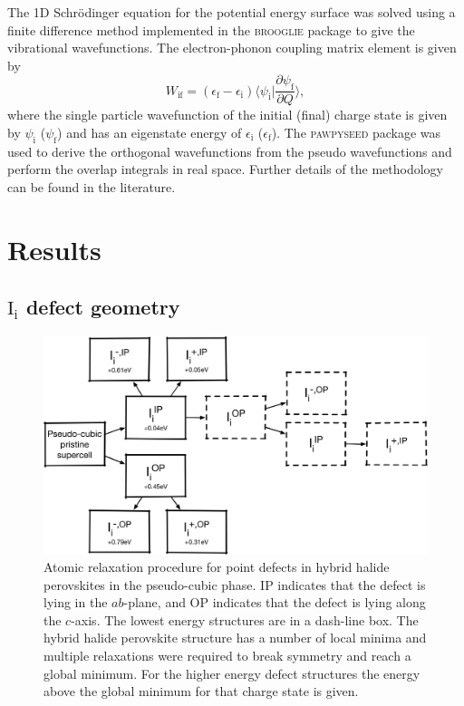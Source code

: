 The 1D Schr\"{o}dinger equation for the potential energy surface was solved using a finite difference method implemented in the \textsc{brooglie} package\autocite{brooglie} to give the vibrational wavefunctions. 
The electron-phonon coupling matrix element is given by
\begin{equation} \label{epcouplingterm}
    W_\textrm{if} = (\epsilon_\textrm{f}-\epsilon_\textrm{i})\langle\psi_\textrm{i}|\frac{\partial\psi_\textrm{f}}{\partial Q}\rangle,
\end{equation}
where the single particle wavefunction of the initial (final) charge state is given by $\psi_\textrm{i}$ ($\psi_\textrm{f}$) and has an eigenstate energy of $\epsilon_\textrm{i}$ ($\epsilon_\textrm{f}$). The \textsc{pawpyseed} package\autocite{pawpyseed} was used to derive the orthogonal wavefunctions from the pseudo wavefunctions and perform the overlap integrals in real space.
Further details of the methodology can be found in the literature.\autocite{Alkauskas2014} 

\section{Results} \label{ch:6-results}

\subsection{$\mathrm{I}_\mathrm{i}$ defect geometry}

\begin{figure}[h!]
\centering
  \includegraphics[width=0.7\columnwidth]{figures/ch6/relaxation_workflow.png}
  \caption[Atomic relaxation procedure for point defects in hybrid halide perovskites]{Atomic relaxation procedure for point defects in hybrid halide perovskites in the pseudo-cubic phase. IP indicates that the defect is lying in the $ab$-plane, and OP indicates that the defect is lying along the $c$-axis. The lowest energy structures are in a dash-line box. The hybrid halide perovskite structure has a number of local minima and multiple relaxations were required to break symmetry and reach a global minimum. For the higher energy defect structures the energy above the global minimum for that charge state is given.}
\label{relaxation_workflow}
\end{figure}

